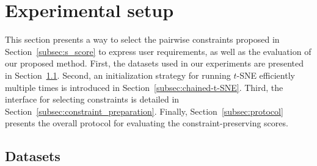 
\section{Experimental setup}\label{XP}
This section presents a way to select the pairwise constraints proposed in Section~\ref{subsec:s_score} to express user requirements, as well as the evaluation of our proposed method.
First, the datasets used in our experiments are presented in Section~\ref{subsec:dataset}. Second, an initialization strategy for running $t$-SNE efficiently multiple times is introduced in Section~\ref{subsec:chained-t-SNE}.
Third, the interface for selecting constraints is detailed in Section~\ref{subsec:constraint_preparation}.
Finally, Section~\ref{subsec:protocol} presents the overall protocol for evaluating the constraint-preserving scores.

\subsection{Datasets}\label{subsec:dataset}

